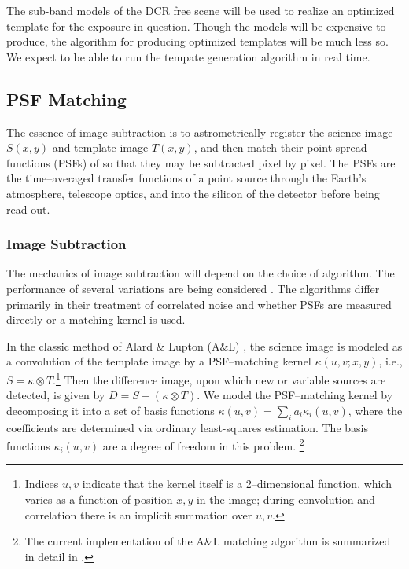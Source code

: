 The sub-band models of the DCR free scene will be used to realize an optimized template for the exposure in question.  Though the models will be expensive to produce, the algorithm for producing optimized templates will be much less so.  We expect to be able to run the tempate generation algorithm in real time. 

\subsection{PSF Matching}
\label{sec:acPSFMatching}

The essence of image subtraction is to astrometrically register the science image $S(x,y)$ and template image $T(x,y)$, and then match their point spread functions (PSFs) of so that they may be subtracted pixel by pixel. The PSFs are the time--averaged transfer functions of a point source through the Earth's atmosphere, telescope optics, and into the silicon of the detector before being read out.

\subsubsection{Image Subtraction}
\label{sec:acImageSubtraction}
The mechanics of image subtraction will depend on the choice of algorithm.  The performance of several variations are being considered .  The algorithms differ primarily in their treatment of correlated noise and whether PSFs are measured directly or a matching kernel is used.

In the classic method of Alard \& Lupton (A\&L) \citep{1998ApJ...503..325A}, the
science image is modeled as a convolution of the template image by a
PSF--matching kernel $\kappa(u,v;x,y)$, i.e., $S = \kappa \otimes
T$.\footnote{Indices $u,v$ indicate that the kernel itself is a
2--dimensional function, which varies as a function of position $x,y$ in
the image; during convolution and correlation there is an implicit
summation over $u,v$.} Then the difference image, upon which new or
variable sources are detected, is given by $D = S - (\kappa \otimes T)$.
We model the PSF--matching kernel by decomposing it into a set of basis
functions $\kappa(u,v) = \sum_i a_i \kappa_i(u,v)$, where the coefficients
are determined via ordinary least-squares estimation.  The basis functions
$\kappa_i(u,v)$ are a degree of freedom in this problem.
\footnote{The current implementation of the A\&L matching algorithm is
summarized in detail in .}

